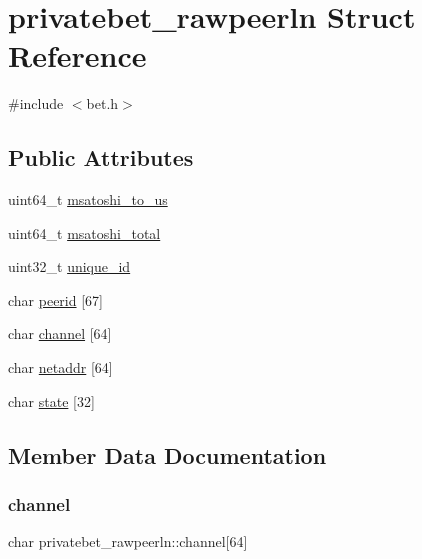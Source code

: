 \hypertarget{structprivatebet__rawpeerln}{}\section{privatebet\+\_\+rawpeerln Struct Reference}
\label{structprivatebet__rawpeerln}


{\ttfamily \#include $<$bet.\+h$>$}

\subsection*{Public Attributes}
\begin{DoxyCompactItemize}
\item 
uint64\+\_\+t \hyperlink{structprivatebet__rawpeerln_af7884913a1c30729415f2adcc5d24ea3}{msatoshi\+\_\+to\+\_\+us}
\item 
uint64\+\_\+t \hyperlink{structprivatebet__rawpeerln_a21761ed0493fefc629ad0c283118edbf}{msatoshi\+\_\+total}
\item 
uint32\+\_\+t \hyperlink{structprivatebet__rawpeerln_aafdd221293a0b3c26dd6648988885c9e}{unique\+\_\+id}
\item 
char \hyperlink{structprivatebet__rawpeerln_a12c96ca3817b6f8a222dd5b8420ebee5}{peerid} \mbox{[}67\mbox{]}
\item 
char \hyperlink{structprivatebet__rawpeerln_ac23c7f3234956f63ad4d0948133784d2}{channel} \mbox{[}64\mbox{]}
\item 
char \hyperlink{structprivatebet__rawpeerln_a8ded3169d57b93d556f08f667ea8db51}{netaddr} \mbox{[}64\mbox{]}
\item 
char \hyperlink{structprivatebet__rawpeerln_a9125d772164f03871992f971d06624eb}{state} \mbox{[}32\mbox{]}
\end{DoxyCompactItemize}


\subsection{Member Data Documentation}
\mbox{\label{structprivatebet__rawpeerln_ac23c7f3234956f63ad4d0948133784d2}} 
\subsubsection{\texorpdfstring{channel}{channel}}
{\footnotesize\ttfamily char privatebet\+\_\+rawpeerln\+::channel\mbox{[}64\mbox{]}}

